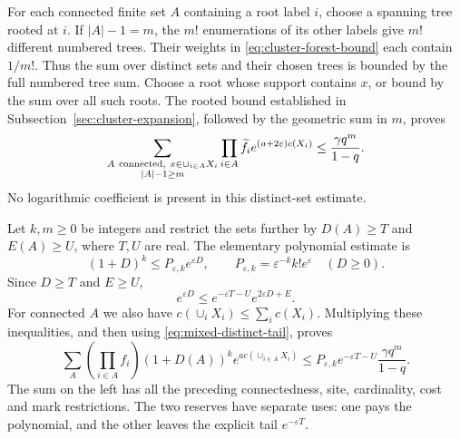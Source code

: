 For each connected finite set $A$ containing a root label $i$, choose
a spanning tree rooted at $i$. If $|A|-1=m$, the $m!$ enumerations
of its other labels give $m!$ different numbered trees. Their weights
in \eqref{eq:cluster-forest-bound} each contain $1/m!$. Thus the
sum over distinct sets and their chosen trees is bounded by the full
numbered tree sum. Choose a root whose support contains $x$, or
bound by the sum over all such roots. The rooted bound established
in Subsection~\ref{sec:cluster-expansion}, followed by the geometric
sum in $m$, proves
\begin{equation}\label{eq:mixed-distinct-tail}
 \sum_{\substack{A\ {\rm connected},\ x\in\cup_{i\in A}X_i\\|A|-1\ge m}}
                   \prod_{i\in A}\widetilde f_i
                                 e^{(a+2\varepsilon)c(X_i)}
                        \le\frac{\gamma q^m}{1-q}.
\end{equation}
No logarithmic coefficient is present in this distinct-set estimate.

Let $k,m\ge0$ be integers and restrict the sets further by
$D(A)\ge T$ and $E(A)\ge U$, where $T,U$ are real. The elementary
polynomial estimate is
\[
 (1+D)^k\le P_{\varepsilon,k}e^{\varepsilon D},\qquad
              P_{\varepsilon,k}=\varepsilon^{-k}k!e^\varepsilon
                         \quad(D\ge0).
\]
Since $D\ge T$ and $E\ge U$,
\[
 e^{\varepsilon D}
       \le e^{-\varepsilon T-U}e^{2\varepsilon D+E}.
\]
For connected $A$ we also have $c(\cup_iX_i)\le\sum_ic(X_i)$.
Multiplying these inequalities, and then using
\eqref{eq:mixed-distinct-tail}, proves
\begin{equation}\label{eq:mixed-reserved-tail}
 \sum_A\left(\prod_{i\in A}f_i\right)(1+D(A))^k
                                      e^{a c(\cup_{i\in A}X_i)}
 \le P_{\varepsilon,k}e^{-\varepsilon T-U}
                                      \frac{\gamma q^m}{1-q}.
\end{equation}
The sum on the left has all the preceding connectedness, site,
cardinality, cost and mark restrictions. The two reserves have
separate uses: one pays the polynomial, and the other leaves the
explicit tail $e^{-\varepsilon T}$.

